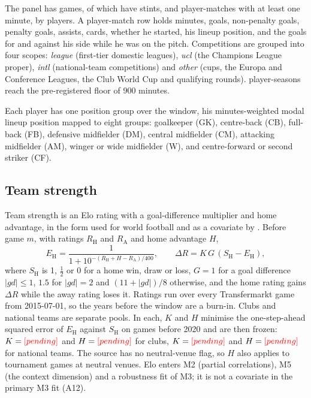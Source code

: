 \documentclass[11pt,a4paper]{article}
\begin{document}
The panel has \NGames{} games, of which \NGamesWithStints{} have stints, and
\NPlayerMatches{} player-matches with at least one minute, by \NPlayersPanel{}
players. A player-match row holds minutes, goals, non-penalty goals, penalty
goals, assists, cards, whether he started, his lineup position, and the goals
for and against his side while he was on the pitch. Competitions are grouped
into four scopes: \emph{league} (first-tier domestic leagues), \emph{ucl}
(the Champions League proper), \emph{intl} (national-team competitions) and
\emph{other} (cups, the Europa and Conference Leagues, the Club World Cup and
qualifying rounds). \NPlayerSeasonsQualifying{} player-seasons reach the
pre-registered floor of 900 minutes.

Each player has one position group over the window, his minutes-weighted modal
lineup position mapped to eight groups: goalkeeper (GK), centre-back (CB),
full-back (FB), defensive midfielder (DM), central midfielder (CM), attacking
midfielder (AM), winger or wide midfielder (W), and centre-forward or second
striker (CF).

\subsection{Team strength}
\label{sec:elo}

Team strength is an Elo rating \citep{elo1978rating} with a goal-difference
multiplier and home advantage, in the form used for world football and as a
covariate by \citet{hvattum2010elo}. Before game $m$, with ratings $R_{\mathrm H}$
and $R_{\mathrm A}$ and home advantage $H$,
\begin{equation}
  E_{\mathrm H} = \frac{1}{1 + 10^{-(R_{\mathrm H} + H - R_{\mathrm A})/400}},
  \qquad
  \Delta R = K\, G\, (S_{\mathrm H} - E_{\mathrm H}),
  \label{eq:elo}
\end{equation}
where $S_{\mathrm H}$ is 1, $\tfrac12$ or 0 for a home win, draw or loss,
$G = 1$ for a goal difference $|\mathit{gd}| \le 1$, $1.5$ for $|\mathit{gd}| = 2$
and $(11 + |\mathit{gd}|)/8$ otherwise, and the home rating gains $\Delta R$
while the away rating loses it. Ratings run over every Transfermarkt game from
2015-07-01, so the years before the window are a burn-in. Clubs and national
teams are separate pools. In each, $K$ and $H$ minimise the one-step-ahead squared error of
$E_{\mathrm H}$ against $S_{\mathrm H}$ on games before 2020 and are then
frozen: $K = \textcolor{red}{[pending]}$ and $H = \textcolor{red}{[pending]}$ for clubs, $K = \textcolor{red}{[pending]}$ and
$H = \textcolor{red}{[pending]}$ for national teams. The source has no neutral-venue flag,
so $H$ also applies to tournament games at neutral venues. Elo enters M2
(partial correlations), M5 (the context dimension) and a robustness fit of M3;
it is not a covariate in the primary M3 fit (A12).
\end{document}
